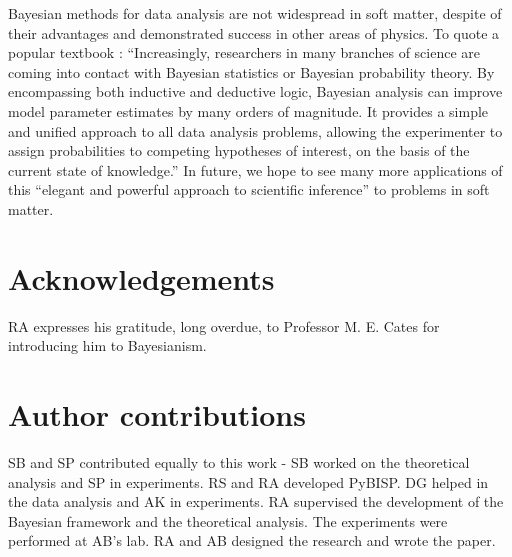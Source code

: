 \documentclass[fleqn,10pt]{wlscirep}
\begin{document}
Bayesian methods for data analysis are not widespread in soft matter,
despite of their advantages and demonstrated success in other areas
of physics. To quote a popular textbook \cite{gregory2005bayesian}:
``Increasingly, researchers in many branches of science are coming
into contact with Bayesian statistics or Bayesian probability theory.
By encompassing both inductive and deductive logic, Bayesian analysis
can improve model parameter estimates by many orders of magnitude.
It provides a simple and unified approach to all data analysis problems,
allowing the experimenter to assign probabilities to competing hypotheses
of interest, on the basis of the current state of knowledge.'' In
future, we hope to see many more applications of this ``elegant and
powerful approach to scientific inference''\cite{gregory2005bayesian}
to problems in soft matter.

\section*{Acknowledgements}
RA expresses
his gratitude, long overdue, to Professor M. E. Cates for introducing
him to Bayesianism.
\section*{Author contributions}
SB and SP contributed equally to this work - SB worked on the theoretical
analysis and SP in experiments. RS and RA developed PyBISP. DG helped
in the data analysis and AK in experiments. RA supervised the development
of the Bayesian framework and the theoretical analysis. The experiments
were performed at AB\textquoteright s lab. RA and AB designed the
research and wrote the paper.
\end{document}
